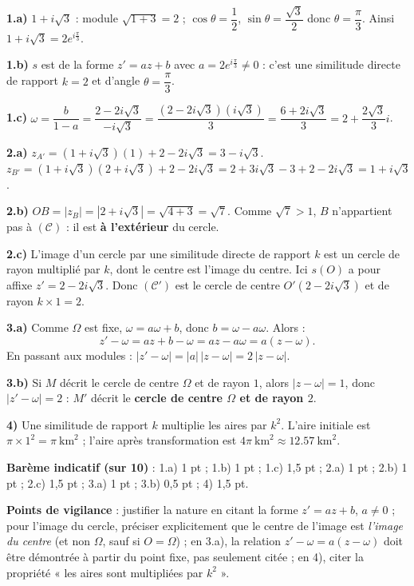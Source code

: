 \documentclass[11pt]{article}
\newcommand{\cle}[1]{{\popxbold\color{popdark}#1}}
\begin{document}
\begin{corrige}
\textbf{1.a)} $1 + i\sqrt{3}$ : module $\sqrt{1+3} = 2$ ; $\cos\theta = \dfrac{1}{2}$, $\sin\theta = \dfrac{\sqrt{3}}{2}$ donc $\theta = \dfrac{\pi}{3}$. Ainsi $1 + i\sqrt{3} = 2e^{i\frac{\pi}{3}}$.

\textbf{1.b)} $s$ est de la forme $z' = az + b$ avec $a = 2e^{i\frac{\pi}{3}} \neq 0$ : c'est une \cle{similitude directe} de rapport $k = 2$ et d'angle $\theta = \dfrac{\pi}{3}$.

\textbf{1.c)} $\omega = \dfrac{b}{1-a} = \dfrac{2 - 2i\sqrt{3}}{-i\sqrt{3}} = \dfrac{(2-2i\sqrt{3})(i\sqrt{3})}{3} = \dfrac{6 + 2i\sqrt{3}}{3} = 2 + \dfrac{2\sqrt{3}}{3}i$.

\textbf{2.a)} $z_{A'} = (1+i\sqrt{3})(1) + 2 - 2i\sqrt{3} = 3 - i\sqrt{3}$.
$z_{B'} = (1+i\sqrt{3})(2+i\sqrt{3}) + 2 - 2i\sqrt{3} = 2 + 3i\sqrt{3} - 3 + 2 - 2i\sqrt{3} = 1 + i\sqrt{3}$.

\textbf{2.b)} $OB = |z_B| = |2 + i\sqrt{3}| = \sqrt{4+3} = \sqrt{7}$. Comme $\sqrt{7} > 1$, $B$ n'appartient pas à $(\mathcal{C})$ : il est \textbf{à l'extérieur} du cercle.

\textbf{2.c)} L'image d'un cercle par une similitude directe de rapport $k$ est un cercle de rayon multiplié par $k$, dont le centre est l'image du centre. Ici $s(O)$ a pour affixe $z' = 2 - 2i\sqrt{3}$. Donc $(\mathcal{C}')$ est le cercle de centre $O'\left(2 - 2i\sqrt{3}\right)$ et de rayon $k \times 1 = 2$.

\textbf{3.a)} Comme $\Omega$ est fixe, $\omega = a\omega + b$, donc $b = \omega - a\omega$. Alors :
\[ z' - \omega = az + b - \omega = az - a\omega = a(z - \omega). \]
En passant aux modules : $|z' - \omega| = |a|\,|z - \omega| = 2\,|z - \omega|$.

\textbf{3.b)} Si $M$ décrit le cercle de centre $\Omega$ et de rayon $1$, alors $|z - \omega| = 1$, donc $|z' - \omega| = 2$ : $M'$ décrit le \textbf{cercle de centre $\Omega$ et de rayon $2$}.

\textbf{4)} Une similitude de rapport $k$ multiplie les aires par $k^2$. L'aire initiale est $\pi \times 1^2 = \pi\ \mathrm{km}^2$ ; l'aire après transformation est $4\pi\ \mathrm{km}^2 \approx \num{12,57}\ \mathrm{km}^2$.

\textbf{Barème indicatif (sur 10)} : 1.a) 1 pt ; 1.b) 1 pt ; 1.c) 1,5 pt ; 2.a) 1 pt ; 2.b) 1 pt ; 2.c) 1,5 pt ; 3.a) 1 pt ; 3.b) 0,5 pt ; 4) 1,5 pt.

\textbf{Points de vigilance} : justifier la nature en citant la forme $z' = az + b$, $a \neq 0$ ; pour l'image du cercle, préciser explicitement que le centre de l'image est \emph{l'image du centre} (et non $\Omega$, sauf si $O = \Omega$) ; en 3.a), la relation $z' - \omega = a(z-\omega)$ doit être démontrée à partir du point fixe, pas seulement citée ; en 4), citer la propriété « les aires sont multipliées par $k^2$ ».
\end{corrige}
\end{document}
